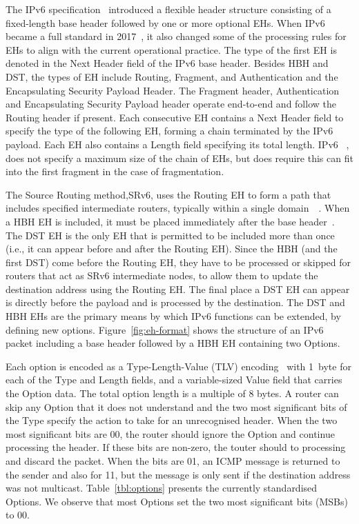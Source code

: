 \documentclass[conference]{IEEEtran}
\begin{document}
The IPv6 specification~\cite{rfc2460} introduced a flexible header structure consisting of a fixed-length base header followed by one or more optional EHs. 
When IPv6 became a full standard in 2017~\cite{RFC8200}, it also changed some of the processing rules for EHs to align with the current operational practice. 
The type of the first EH is denoted in the Next Header field of the IPv6 base header. 
Besides HBH and DST, the types of EH include Routing, Fragment, and
Authentication and the Encapsulating Security Payload Header. 
The Fragment header, Authentication and Encapsulating Security Payload header operate end-to-end and follow the Routing header if present. 
Each consecutive EH contains a Next Header field to specify the type of the following EH, forming a chain terminated by the IPv6 payload. Each EH also contains a Length field specifying its total length.  IPv6 ~\cite{RFC8200}, does not specify a maximum size of the chain of EHs, but does  require this can fit into the first fragment in the case of fragmentation. 

The Source Routing method,SRv6, uses the Routing EH to form a path that includes specified intermediate routers, typically within a single domain~\cite{srv6}~\cite{srperf}. When a HBH EH is included, it must be placed immediately after the base header~\cite{RFC8200}.  The DST EH is the only EH that is permitted to be included more than once (i.e., it can appear before and after the Routing EH).  Since the HBH (and the first DST) come before the Routing EH, they have to be processed or skipped for routers that act as SRv6 intermediate nodes, to allow them to update the destination address using the Routing EH.  The final place a DST EH can appear is directly before the payload and is processed by the destination. The DST and HBH EHs are the primary means by which IPv6 functions can be extended, by defining new options. Figure~\ref{fig:eh-format} shows the structure of an IPv6 packet including a base header followed by a HBH EH containing two Options. 

Each option is encoded as a Type-Length-Value (TLV) encoding~\cite{RFC8200} with 1~byte for each of the Type and Length fields, and a variable-sized Value field that carries the Option data. The total option length is a multiple of 8 bytes. 
A router can skip any Option that it does not understand and the two most significant bits of the Type
specify the action to take for an unrecognised header. When the two most significant bits are 00, the router should
ignore the Option and continue processing the header. 
If these bits are non-zero, the touter should to
processing and discard the packet. When the bits are 01, an ICMP message is returned to
the sender and also for 11,  but the message is only sent if the destination address was not multicast.  
Table~\ref{tbl:options} presents the currently standardised 
Options.  We observe that most Options set the two most significant bits
(MSBs) to 00.  
\end{document}
